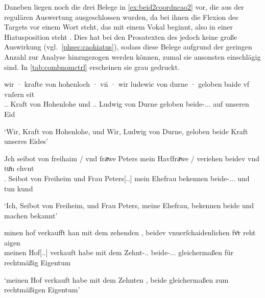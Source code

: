 Daneben liegen noch die drei Belege in \cref{ex:beid2coordncao2} vor, die aus
der regulären Auswertung ausgeschlossen wurden, da bei ihnen die Flexion des
Targets vor einem Wort steht, das mit einem Vokal beginnt, also in einer
Hiatusposition steht \autocites[vgl.][90--91]{askedal1973}[191--193,
201]{gjelsten1980}. Dies hat bei den Prosatexten des \CAO{} jedoch
keine große Auswirkung (vgl.~\cref{phsec:caohiatus}), sodass diese Belege
aufgrund der geringen Anzahl zur Analyse hinzugezogen werden können, zumal sie
ansonsten einschlägig sind. In \cref{tab:combnomctrl} erscheinen sie grau
gedruckt.

\begin{exe}
\ex \label{ex:beid2coordncao2}
	\begin{xlist}
	\ex \label{ex:beid2coordncao2_1}
		\gll wir · krafte von hohenloch · vn̄ · wir ludewic
			von durne · geloben baide vf vnſern eit \\
			\Fsg\subM.\Hon.\Nom{} {} Kraft von Hohenlohe {} und {}
			\Fsg\subM.\Hon.\Nom{} Ludwig von Durne {} geloben
			beide-\Nom.\Pl.\MascM.\St{} auf unseren Eid \\
		\begin{taggedline}{\parencites(Burg Hohlach, Kr.~Neustadt an der Aisch-Bad Windsheim)[\pno~2529, 563.5--6]{cao3}}
		\trans `Wir, Kraft von Hohenlohe, und Wir, Ludwig von Durne,
			geloben beide Kraft unseres Eides'
		\end{taggedline}

	\ex \label{ex:beid2coordncao2_2}
		\gll Jch seibot von freihaim / vnd fraͮwe Peters mein
			Havſfraͮwe / veriehen beidev vnd tuͦn chvnt \\
			\Fsg\subM.\Nom{} Seibot von Freiheim {} und Frau
			Peters[\Nom.\Sg.\FemF] mein Ehefrau {} bekennen
			beide-\Nom.\Pl.\NeutMF.\St{} und tun kund \\
		\begin{taggedline}{\parencites(München, 1299)[\pno~3248, 416.23]{cao4}}
		\trans `Ich, Seibot von Freiheim, und Frau Peters, meine Ehefrau,
			bekennen beide und machen bekannt'
		\end{taggedline}

	\ex \label{ex:beid2coordncao2_3}
		\gll minen hof \textelp{} verkaufft han mit dem
			zehenden \textelp{}, beidev vnuerſchaidenlichen
			fvͤr reht aigen \\
			meinen Hof[\Acc.\Sg.\MascI] {} verkauft habe mit dem
			Zehnt-\Dat.\Sg.\MascI{} {} beide-\Acc.\Pl.\NeutI.\St{}
			gleichermaßen für rechtmäßig Eigentum \\
		\begin{taggedline}{\parencites(Augsburg, 1283)[\pno~N~241, 195.37--39]{cao5}}
		\trans `meinen Hof verkauft habe mit dem Zehnten \textelp{}, beide
			gleichermaßen zum rechtmäßigen Eigentum'
		\end{taggedline}
	\end{xlist}
\end{exe}

